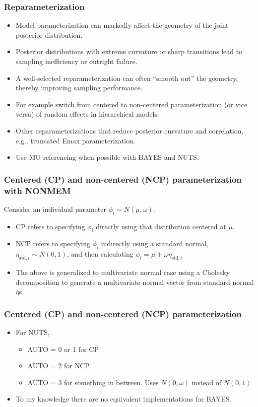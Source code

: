 \documentclass[handout]{beamer}
\begin{document}
\begin{frame}
  \frametitle{Reparameterization}

  \begin{itemize}
  \item Model parameterization can markedly affect the geometry of the
    joint posterior distribution.
\item Posterior distributions with extreme curvature or sharp
  transitions lead to sampling inefficiency or outright failure.
\item A well-selected reparameterization can often ``smooth out'' the
  geometry, thereby improving sampling performance.
\item For example switch from centered to non-centered parameterization (or vice
  versa) of random effects in hierarchical models.
\item Other reparameterizations that reduce posterior curvature and
  correlation, e.g., truncated Emax parameterization.
\item Use MU referencing when possible with BAYES and NUTS.
\end{itemize}
  
\end{frame}

\begin{frame}
  \frametitle{Centered (CP) and non-centered (NCP) parameterization
    with NONMEM}
  
Consider an individual parameter $\phi_i \sim N(\mu, \omega)$.
\begin{itemize}
\item CP refers to specifying $\phi_i$ directly using that distribution
  centered at $\mu$.
\item NCP refers to specifying $\phi_i$ indirectly using a standard
  normal, $\eta_{\text{std},i} \sim N(0, 1)$, and
  then calculating $\phi_i = \mu + \omega \eta_{\text{std},i}$
\item The above is generalized  to multivariate normal case using a
  Cholesky decomposition to generate a multivariate normal vector from
  standard normal $\eta$s.
\end{itemize}

\end{frame}


\begin{frame}
  \frametitle{Centered (CP) and non-centered (NCP) parameterization}
  
  \begin{itemize}
  \item For NUTS, 
    \begin{itemize}
    \item AUTO = 0 or 1 for CP
      \item AUTO = 2 for NCP
 \item AUTO = 3 for something in between. Uses $N(0, \omega)$ instead
   of $N(0, 1)$
    \end{itemize}
\item To my knowledge there are no equivalent implementations for BAYES.
  \end{itemize}

\end{frame}
\end{document}
